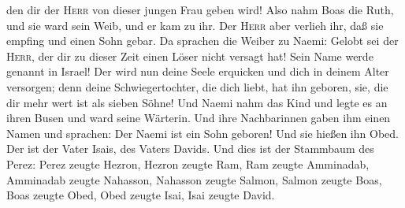den dir der \textsc{Herr} von dieser jungen Frau geben wird!
 Also nahm Boas die Ruth, und sie ward sein Weib, und er
kam zu ihr. Der \textsc{Herr} aber verlieh ihr, daß sie empfing und
einen Sohn gebar.  Da sprachen die Weiber zu Naemi:
Gelobt sei der \textsc{Herr}, der dir zu dieser Zeit einen Löser nicht
versagt hat! Sein Name werde genannt in Israel!  Der wird
nun deine Seele erquicken und dich in deinem Alter versorgen; denn deine
Schwiegertochter, die dich liebt, hat ihn geboren, sie, die dir mehr
wert ist als sieben Söhne!  Und Naemi nahm das Kind und
legte es an ihren Busen und ward seine Wärterin.  Und
ihre Nachbarinnen gaben ihm einen Namen und sprachen: Der Naemi ist ein
Sohn geboren! Und sie hießen ihn Obed. Der ist der Vater Isais, des
Vaters Davids.  Und dies ist der Stammbaum des Perez:
 Perez zeugte Hezron, Hezron zeugte Ram, Ram zeugte
Amminadab,  Amminadab zeugte Nahasson, Nahasson zeugte
Salmon,  Salmon zeugte Boas, Boas zeugte Obed, Obed
zeugte Isai,  Isai zeugte David.
